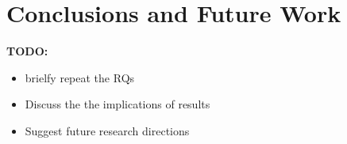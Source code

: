 \section{Conclusions and Future Work}
\textbf{TODO:}
\begin{itemize}
    \item brielfy repeat the RQs
    \item Discuss the the implications of results
    \item Suggest future research directions
\end{itemize}